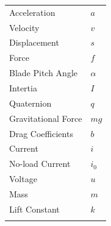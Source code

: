 \documentclass{article}
\begin{document}
\begin{center}
\begin{tabular}{l|l}
Acceleration & $a$ \\
Velocity & $v$ \\\rowcolor{gainsboro}
Displacement & $s$ \\
Force & $f$ \\\rowcolor{gainsboro}
Blade Pitch Angle & $\alpha$ \\
Intertia & $I$  \\\rowcolor{gainsboro}
Quaternion & $q$ \\
Gravitational Force & $mg$ \\\rowcolor{gainsboro}
Drag Coefficients & $b$  \\
Current & $i$ \\\rowcolor{gainsboro}
No-load Current & $i_0$ \\
Voltage & $u$ \\\rowcolor{gainsboro}
Mass & $m$ \\
Lift Constant & $k$\\\rowcolor{gainsboro}
\end{tabular}
\end{center}
\newpage


\tableofcontents
\listoffigures
\listoftables
\newpage


\newpage


\newpage


\newpage


\newpage


\newpage


\newpage


\newpage



\end{document}
